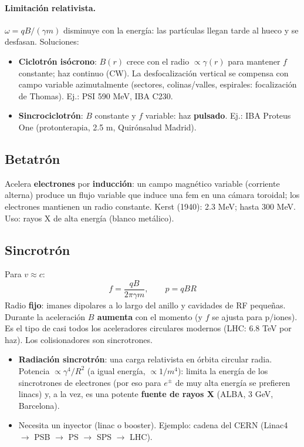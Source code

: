 \paragraph{Limitación relativista.} $\omega=qB/(\gamma m)$ disminuye con la energía: las partículas llegan tarde al hueco y se desfasan.
Soluciones:
\begin{itemize}
\item \textbf{Ciclotrón isócrono}: $B(r)$ crece con el radio $\propto\gamma(r)$ para mantener $f$ constante; haz continuo (CW). La desfocalización
vertical se compensa con campo variable azimutalmente (sectores, colinas/valles, espirales: focalización de Thomas). Ej.: PSI 590 MeV, IBA C230.
\item \textbf{Sincrociclotrón}: $B$ constante y $f$ variable: haz \textbf{pulsado}. Ej.: IBA Proteus One (protonterapia, 2.5 m, Quirónsalud Madrid).
\end{itemize}

\subsection{Betatrón}
Acelera \textbf{electrones} por \textbf{inducción}: un campo magnético variable (corriente alterna) produce un flujo variable que induce una fem
en una cámara toroidal; los electrones mantienen un radio constante. Kerst (1940): 2.3 MeV; hasta 300 MeV. Uso: rayos X de alta energía (blanco metálico).

\subsection{Sincrotrón}
\begin{clave}[Sincrotrón]
Para $v\approx c$:
\[ f=\frac{qB}{2\pi\gamma m},\qquad p=qBR \]
Radio \textbf{fijo}: imanes dipolares a lo largo del anillo y cavidades de RF pequeñas. Durante la aceleración \textbf{$B$ aumenta} con el momento
(y $f$ se ajusta para p/iones). Es el tipo de casi todos los aceleradores circulares modernos (LHC: 6.8 TeV por haz). Los colisionadores son sincrotrones.
\end{clave}
\begin{itemize}
\item \textbf{Radiación sincrotrón}: una carga relativista en órbita circular radia. Potencia $\propto\gamma^4/R^2$ (a igual energía, $\propto1/m^4$):
limita la energía de los sincrotrones de electrones (por eso para $e^\pm$ de muy alta energía se prefieren linacs) y, a la vez, es una potente
\textbf{fuente de rayos X} (ALBA, 3 GeV, Barcelona).
\item Necesita un inyector (linac o booster). Ejemplo: cadena del CERN (Linac4 $\to$ PSB $\to$ PS $\to$ SPS $\to$ LHC).
\end{itemize}

